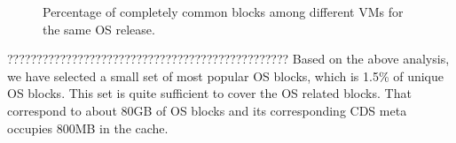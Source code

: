 
\begin{figure}
\centering
{}
\caption{Percentage of completely common blocks among different VMs for the same OS release.}
\label{fig:OSunchanged}
\end{figure}

????????????????????????????????????????????????
Based on the above analysis, we have selected a small set of most popular
OS blocks, which is 1.5\% of  unique OS blocks. This set
is quite sufficient to cover the OS related blocks. 
That correspond to about  80GB of OS blocks and its corresponding CDS meta occupies 800MB in the cache.






